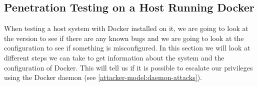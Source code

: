 \subsection{Penetration Testing on a Host Running Docker}\label{subsection:testing-host}
When testing a host system with Docker installed on it, we are going to look at the version to see if there are any known bugs and we are going to look at the configuration to see if something is misconfigured. In this section we will look at different steps we can take to get information about the system and the configuration of Docker. This will tell us if it is possible to escalate our privileges using the Docker daemon (see \autoref{attacker-model:daemon-attacks}).





